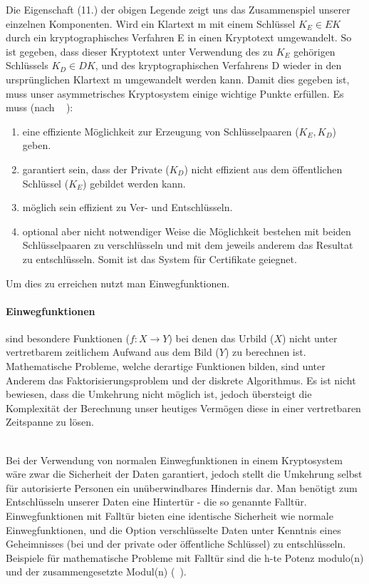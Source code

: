 \documentclass[paper=a4,11pt,german]{scrartcl} %
\begin{document}
Die Eigenschaft (11.) der obigen Legende zeigt uns das Zusammenspiel unserer einzelnen Komponenten. Wird ein Klartext m mit einem Schlüssel $K_E \in EK$ durch ein kryptographisches Verfahren E in einen Kryptotext umgewandelt. So ist gegeben, dass dieser Kryptotext unter Verwendung des zu $K_E$ gehörigen Schlüssels $K_D \in DK$, und des kryptographischen Verfahrens D wieder in den ursprünglichen Klartext m umgewandelt werden kann. Damit dies gegeben ist, muss unser asymmetrisches Kryptosystem einige wichtige Punkte erfüllen.
Es muss (nach ~\cite{Eckert13} ):
\newpage
\begin{enumerate}
\item eine effiziente Möglichkeit zur Erzeugung von Schlüsselpaaren ($K_E,K_D$) geben.
\item garantiert sein, dass der Private ($K_D$) nicht effizient aus dem öffentlichen Schlüssel ($K_E$) gebildet werden kann.
\item möglich sein effizient zu Ver- und Entschlüsseln.
\item optional aber nicht notwendiger Weise die Möglichkeit bestehen mit beiden Schlüsselpaaren zu verschlüsseln und mit dem jeweils anderem das Resultat zu entschlüsseln. Somit ist das System für Certifikate geiegnet.
\end{enumerate}

Um dies zu erreichen nutzt man Einwegfunktionen.
\paragraph{Einwegfunktionen}
 sind besondere Funktionen ($f: X \rightarrow Y$) bei denen das Urbild ($X$) nicht unter vertretbarem zeitlichem Aufwand aus dem Bild ($Y$) zu berechnen ist. Mathematische Probleme, welche derartige Funktionen bilden, sind unter Anderem das Faktorisierungsproblem und der diskrete Algorithmus. Es ist nicht bewiesen, dass die Umkehrung nicht möglich ist, jedoch übersteigt die Komplexität der Berechnung unser heutiges Vermögen diese in einer vertretbaren Zeitspanne zu lösen.

\ \\
Bei der Verwendung von normalen Einwegfunktionen in einem Kryptosystem wäre zwar die Sicherheit der Daten garantiert, jedoch stellt die Umkehrung selbst für autorisierte Personen ein unüberwindbares Hindernis dar. Man benötigt zum Entschlüsseln unserer Daten eine Hintertür - die so genannte Falltür. Einwegfunktionen mit Falltür bieten eine identische Sicherheit wie normale Einwegfunktionen, und die Option verschlüsselte Daten unter Kenntnis eines Geheimnisses (bei und der private oder öffentliche Schlüssel) zu entschlüsseln. Beispiele für mathematische Probleme mit Falltür sind die h-te Potenz modulo(n) und der zusammengesetzte Modul(n) (~\cite{Eckert13}). 
\end{document}
